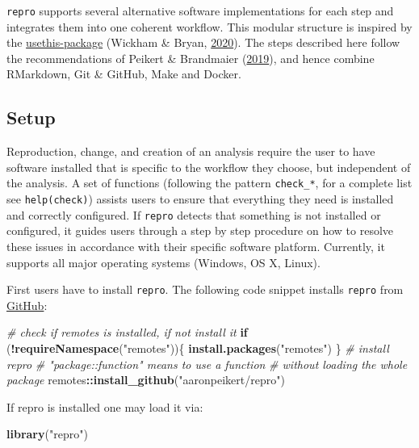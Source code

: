 \documentclass[12pt,a4paper,twoside]{article}
\newenvironment{Shaded}{\begin{snugshade}}{\end{snugshade}}
\newcommand{\CommentTok}[1]{\textcolor[rgb]{0.56,0.35,0.01}{\textit{#1}}}
\newcommand{\ControlFlowTok}[1]{\textcolor[rgb]{0.13,0.29,0.53}{\textbf{#1}}}
\newcommand{\KeywordTok}[1]{\textcolor[rgb]{0.13,0.29,0.53}{\textbf{#1}}}
\newcommand{\NormalTok}[1]{#1}
\newcommand{\OperatorTok}[1]{\textcolor[rgb]{0.81,0.36,0.00}{\textbf{#1}}}
\newcommand{\StringTok}[1]{\textcolor[rgb]{0.31,0.60,0.02}{#1}}
\begin{document}
\texttt{repro} supports several alternative software implementations for each step and integrates them into one coherent workflow.
This modular structure is inspired by the \href{https://usethis.r-lib.org}{usethis-package} (Wickham \& Bryan, \protect\hyperlink{ref-R-usethis}{2020}).
The steps described here follow the recommendations of Peikert \& Brandmaier (\protect\hyperlink{ref-peikertReproducibleDataAnalysis2019}{2019}), and hence combine RMarkdown, Git \& GitHub, Make and Docker.

\hypertarget{setup}{%
\subsection{Setup}\label{setup}}

Reproduction, change, and creation of an analysis require the user to have software installed that is specific to the workflow they choose, but independent of the analysis.
A set of functions (following the pattern \texttt{check\_*}, for a complete list see \texttt{help(check)}) assists users to ensure that everything they need is installed and correctly configured.
If \texttt{repro} detects that something is not installed or configured, it guides users through a step by step procedure on how to resolve these issues in accordance with their specific software platform.
Currently, it supports all major operating systems (Windows, OS X, Linux).

First users have to install \texttt{repro}. The following code snippet installs \texttt{repro} from \href{https://github.com/aaronpeikert/repro}{GitHub}:

\begin{Shaded}
\begin{Highlighting}[]
\CommentTok{# check if remotes is installed, if not install it}
\ControlFlowTok{if}\NormalTok{ (}\OperatorTok{!}\KeywordTok{requireNamespace}\NormalTok{(}\StringTok{"remotes"}\NormalTok{))\{}
  \KeywordTok{install.packages}\NormalTok{(}\StringTok{"remotes"}\NormalTok{)}
\NormalTok{\}}
\CommentTok{# install repro}
\CommentTok{# "package::function" means to use a function}
\CommentTok{# without loading the whole package}
\NormalTok{remotes}\OperatorTok{::}\KeywordTok{install_github}\NormalTok{(}\StringTok{"aaronpeikert/repro"}\NormalTok{)}
\end{Highlighting}
\end{Shaded}

If repro is installed one may load it via:

\begin{Shaded}
\begin{Highlighting}[]
\KeywordTok{library}\NormalTok{(}\StringTok{"repro"}\NormalTok{)}
\end{Highlighting}
\end{Shaded}
\end{document}
